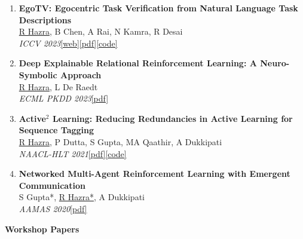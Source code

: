 \documentclass[a4paper,10pt]{article}
\newcommand{\cvlink}[2]{\href{#2}{\small\textcolor{accent}{[#1]}}}
\begin{document}
\begin{enumerate}[leftmargin=1.6em, label={\small\arabic*.}, itemsep=2pt]
  \item \textbf{EgoTV: Egocentric Task Verification from Natural Language Task Descriptions}\\
    \underline{R Hazra}, B Chen, A Rai, N Kamra, R Desai\\
    \textit{ICCV 2023}\quad\cvlink{web}{https://rishihazra.github.io/EgoTV/}\;\cvlink{pdf}{https://arxiv.org/pdf/2303.16975.pdf}\;\cvlink{code}{https://github.com/facebookresearch/EgoTV}

  \item \textbf{Deep Explainable Relational Reinforcement Learning: A Neuro-Symbolic Approach}\\
    \underline{R Hazra}, L De Raedt\\
    \textit{ECML PKDD 2023}\quad\cvlink{pdf}{https://arxiv.org/pdf/2304.08349.pdf}

  \item \textbf{Active$^2$ Learning: Reducing Redundancies in Active Learning for Sequence Tagging}\\
    \underline{R Hazra}, P Dutta, S Gupta, MA Qaathir, A Dukkipati\\
    \textit{NAACL-HLT 2021}\quad\cvlink{pdf}{https://www.aclweb.org/anthology/2021.naacl-main.159.pdf}\;\cvlink{code}{https://github.com/parag1604/A2L}

  \item \textbf{Networked Multi-Agent Reinforcement Learning with Emergent Communication}\\
    S Gupta*, \underline{R Hazra*}, A Dukkipati\\
    \textit{AAMAS 2020}\quad\cvlink{pdf}{https://arxiv.org/pdf/2004.02780.pdf}

\end{enumerate}

\textbf{\small Workshop Papers}
\end{document}
